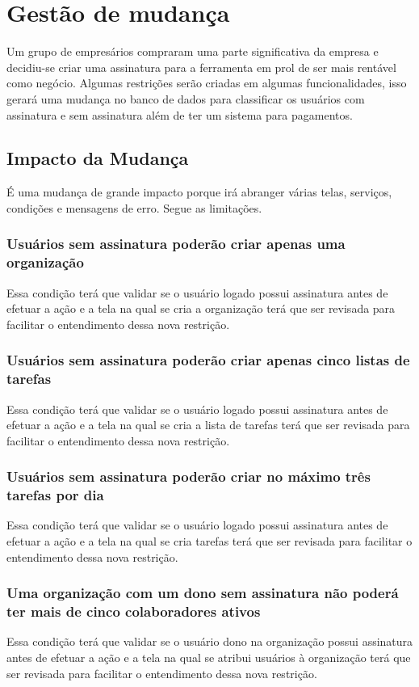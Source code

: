 \chapter{Gestão de mudança}
Um grupo de empresários compraram uma parte significativa da empresa e decidiu-se criar uma assinatura para a ferramenta em prol de ser mais rentável como negócio. Algumas restrições serão criadas em algumas funcionalidades, isso gerará uma mudança no banco de dados para classificar os usuários com assinatura e sem assinatura além de ter um sistema para pagamentos. 

\section*{Impacto da Mudança}
É uma mudança de grande impacto porque irá abranger várias telas, serviços, condições e mensagens de erro. Segue as limitações.

\subsection*{Usuários sem assinatura poderão criar apenas uma organização}
Essa condição terá que validar se o usuário logado possui assinatura antes de efetuar a ação e a tela na qual se cria a organização terá que ser revisada para facilitar o entendimento dessa nova restrição.

\subsection*{Usuários sem assinatura poderão criar apenas cinco listas de tarefas}
Essa condição terá que validar se o usuário logado possui assinatura antes de efetuar a ação e a tela na qual se cria a lista de tarefas terá que ser revisada para facilitar o entendimento dessa nova restrição.

\subsection*{Usuários sem assinatura poderão criar no máximo três tarefas por dia}
Essa condição terá que validar se o usuário logado possui assinatura antes de efetuar a ação e a tela na qual se cria tarefas terá que ser revisada para facilitar o entendimento dessa nova restrição.

\subsection*{Uma organização com um dono sem assinatura não poderá ter mais de cinco colaboradores ativos}
Essa condição terá que validar se o usuário dono na organização possui assinatura antes de efetuar a ação e a tela na qual se atribui usuários à organização terá que ser revisada para facilitar o entendimento dessa nova restrição.

